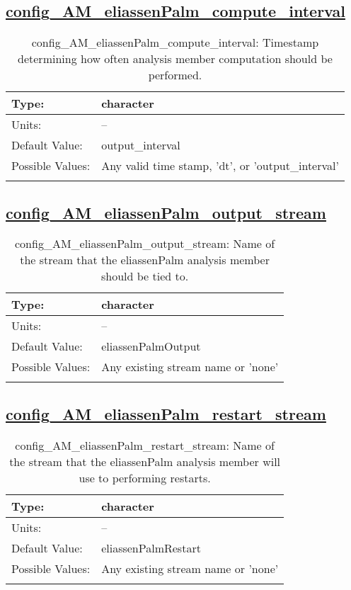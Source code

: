 \subsection[config\_AM\_eliassenPalm\_compute\_interval]{\hyperref[sec:nm_tab_AM_eliassenPalm]{config\_AM\_eliassenPalm\_compute\_interval}}
\label{subsec:nm_sec_config_AM_eliassenPalm_compute_interval}
\begin{center}
\begin{longtable}{| p{2.0in} || p{4.0in} |}
    \hline
    Type: & character \\
    \hline
    Units: & -- \\
    \hline
    Default Value: & output\_interval \\
    \hline
    Possible Values: & Any valid time stamp, 'dt', or 'output\_interval' \\
    \hline
    \caption{config\_AM\_eliassenPalm\_compute\_interval: Timestamp determining how often analysis member computation should be performed.}
\end{longtable}
\end{center}
\subsection[config\_AM\_eliassenPalm\_output\_stream]{\hyperref[sec:nm_tab_AM_eliassenPalm]{config\_AM\_eliassenPalm\_output\_stream}}
\label{subsec:nm_sec_config_AM_eliassenPalm_output_stream}
\begin{center}
\begin{longtable}{| p{2.0in} || p{4.0in} |}
    \hline
    Type: & character \\
    \hline
    Units: & -- \\
    \hline
    Default Value: & eliassenPalmOutput \\
    \hline
    Possible Values: & Any existing stream name or 'none' \\
    \hline
    \caption{config\_AM\_eliassenPalm\_output\_stream: Name of the stream that the eliassenPalm analysis member should be tied to.}
\end{longtable}
\end{center}
\subsection[config\_AM\_eliassenPalm\_restart\_stream]{\hyperref[sec:nm_tab_AM_eliassenPalm]{config\_AM\_eliassenPalm\_restart\_stream}}
\label{subsec:nm_sec_config_AM_eliassenPalm_restart_stream}
\begin{center}
\begin{longtable}{| p{2.0in} || p{4.0in} |}
    \hline
    Type: & character \\
    \hline
    Units: & -- \\
    \hline
    Default Value: & eliassenPalmRestart \\
    \hline
    Possible Values: & Any existing stream name or 'none' \\
    \hline
    \caption{config\_AM\_eliassenPalm\_restart\_stream: Name of the stream that the eliassenPalm analysis member will use to performing restarts.}
\end{longtable}
\end{center}
